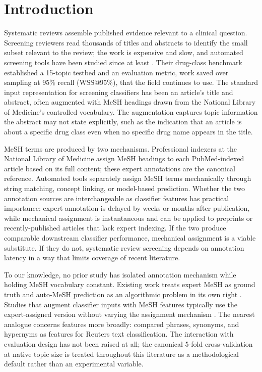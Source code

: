 \documentclass{article}
\begin{document}
\section{Introduction}

Systematic reviews assemble published evidence relevant to a clinical question. Screening reviewers read thousands of titles and abstracts to identify the small subset relevant to the review; the work is expensive and slow, and automated screening tools have been studied since at least . Their drug-class benchmark established a 15-topic testbed and an evaluation metric, work saved over sampling at 95\% recall (WSS@95\%), that the field continues to use. The standard input representation for screening classifiers has been an article's title and abstract, often augmented with MeSH headings drawn from the National Library of Medicine's controlled vocabulary. The augmentation captures topic information the abstract may not state explicitly, such as the indication that an article is about a specific drug class even when no specific drug name appears in the title.

MeSH terms are produced by two mechanisms. Professional indexers at the National Library of Medicine assign MeSH headings to each PubMed-indexed article based on its full content; these expert annotations are the canonical reference. Automated tools separately assign MeSH terms mechanically through string matching, concept linking, or model-based prediction. Whether the two annotation sources are interchangeable as classifier features has practical importance: expert annotation is delayed by weeks or months after publication, while mechanical assignment is instantaneous and can be applied to preprints or recently-published articles that lack expert indexing. If the two produce comparable downstream classifier performance, mechanical assignment is a viable substitute. If they do not, systematic review screening depends on annotation latency in a way that limits coverage of recent literature.

To our knowledge, no prior study has isolated annotation mechanism while holding MeSH vocabulary constant. Existing work treats expert MeSH as ground truth and auto-MeSH prediction as an algorithmic problem in its own right \cite{mao2017meshnow,jin2018pico}. Studies that augment classifier inputs with MeSH features typically use the expert-assigned version without varying the assignment mechanism \cite{cohen2008,matwin2010}. The nearest analogue concerns features more broadly:  compared phrases, synonyms, and hypernyms as features for Reuters text classification. The interaction with evaluation design has not been raised at all; the canonical 5-fold cross-validation at native topic size is treated throughout this literature as a methodological default rather than an experimental variable.
\end{document}
